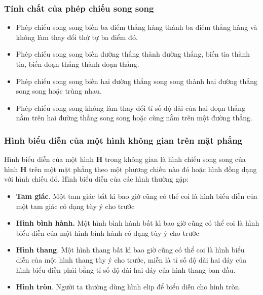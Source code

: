\subsubsection{Tính chất của phép chiếu song song}
\begin{itemize}
	\item Phép chiếu song song biến ba điểm thẳng hàng thành ba điểm thẳng hàng và không làm thay đổi thứ tự ba điểm đó.
	\item Phép chiếu song song biến đường thẳng thành đường thẳng, biến tia thành tia, biến đoạn thẳng thành đoạn thẳng.
	\item Phép chiếu song song biến hai đường thẳng song song thành hai đường thẳng song song hoặc trùng nhau.
	\item Phép chiếu song song không làm thay đổi tỉ số độ dài của hai đoạn thẳng nằm trên hai đường thẳng song song hoặc cùng nằm trên một đường thẳng.
\end{itemize}
\subsubsection{Hình biểu diễn của một hình không gian trên mặt phẳng}
Hình biểu diễn của một hình $\mathbf{H}$ trong không gian là hình chiếu song song của hình $\mathbf{H}$ trên một mặt phẳng theo một phương chiếu nào đó hoặc hình đồng dạng với hình chiếu đó.
Hình biểu diễn của các hình thường gặp:
\begin{itemize}
	\item {\bf Tam giác}. Một tam giác bất kì bao giờ cũng có thể coi là hình biểu diễn của một tam giác có dạng tùy ý cho trước
	\item {\bf Hình bình hành.} Một hình bình hành bất kì bao giờ cũng có thể coi là hình biểu diễn của một hình bình hành có dạng tùy ý cho trước
	\item {\bf Hình thang}. Một hình thang bất kì bao giờ cũng có thể coi là hình biểu diễn của một hình thang tùy ý cho trước, miễn là tỉ số độ dài hai đáy của hình biểu diễn phải bằng tỉ số độ dài hai đáy của hình thang ban đầu.
	\item {\bf Hình tròn}. Người ta thường dùng hình elip để biểu diễn cho hình tròn.
\end{itemize}
